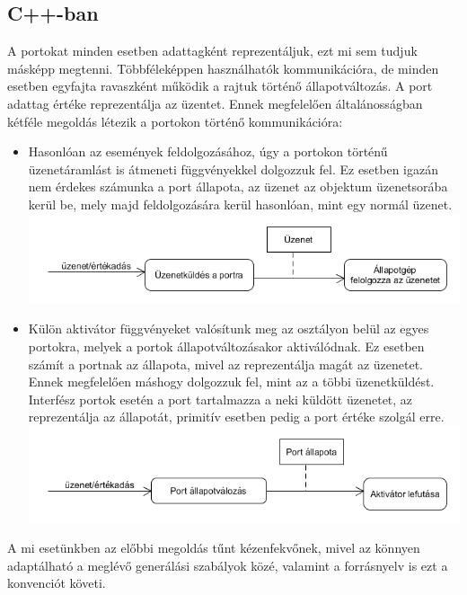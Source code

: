 \documentclass[a4paper,12pt]{report}
\begin{document}
\subsection{C++-ban} \label{cpp_gen_port}
A portokat minden esetben adattagként reprezentáljuk, ezt mi sem tudjuk másképp megtenni. Többféleképpen használhatók kommunikációra, de minden esetben egyfajta ravaszként működik a rajtuk történő állapotváltozás. A port adattag értéke reprezentálja az üzentet. Ennek megfelelően általánosságban kétféle megoldás létezik a portokon történő kommunikációra:
\begin{itemize}
\item Hasonlóan az események feldolgozásához, úgy a portokon történű üzenetáramlást is átmeneti függvényekkel dolgozzuk fel. Ez esetben igazán nem érdekes számunka a port állapota, az üzenet az objektum üzenetsorába kerül be, mely majd feldolgozására kerül hasonlóan, mint egy normál üzenet.  \\
\includegraphics[scale=0.6]{port_actfun.png}
\item Külön aktivátor függvényeket valósítunk meg az osztályon belül az egyes portokra, melyek a portok állapotváltozásakor aktiválódnak. Ez esetben számít a portnak az állapota, mivel az reprezentálja magát az üzenetet. Ennek megfelelően máshogy dolgozzuk fel, mint az a többi üzenetküldést. Interfész portok esetén a port tartalmazza a neki küldött üzenetet, az reprezentálja az állapotát, primitív esetben pedig a port értéke szolgál erre. \\
\includegraphics[scale=0.6]{port_sendm.png} \\
\end{itemize}

A mi esetünkben az előbbi megoldás tűnt kézenfekvőnek, mivel az könnyen adaptálható a meglévő generálási szabályok közé, valamint a forrásnyelv is ezt a konvenciót követi. 
\end{document}
